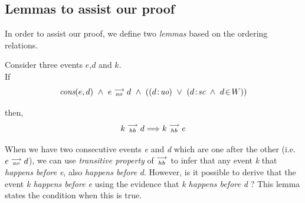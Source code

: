 \subsection{Lemmas to assist our proof}    
In order to assist our proof, we define two \textit{lemmas} based on the ordering relations. 

\begin{lemma} Consider three events $e$,$d$ and $k$. \\

    If
        \[
            \cons{e}{d} \ \wedge \ \reln{e}{ao}{d} \ \wedge \
            (
                (\et{d}{uo}) \ \vee \
                (\et{d}{sc} \ \wedge \ \event{d}{W})
            )
        \]
        
    then,
        \[
            k\stackrel{\longrightarrow}{_{hb}}d \Longrightarrow k\stackrel{\longrightarrow}{_{hb}}e
        \]
      
    When we have two consecutive events \textit{e} and \textit{d} which are one after the other (i.e. $e\stackrel{\longrightarrow}{_{ao}}d$), we can use \textit{transitive property} of $\stackrel{\longrightarrow}{_{hb}}$ to infer that any event \textit{k} that \textit{happens before} \textit{e}, also \textit{happens before} \textit{d}. However, is it possible to derive that the event \textit{k happens before e} using the evidence that \textit{k happens before d} ? This lemma states the condition when this is true.
    
\end{lemma}

